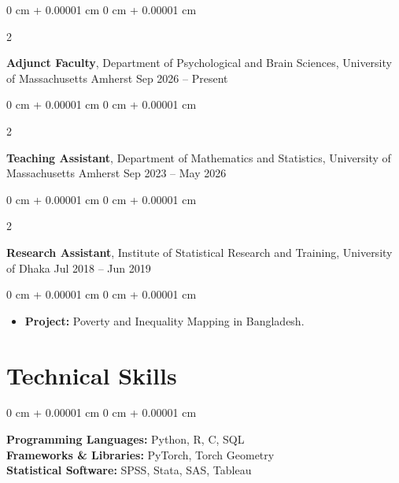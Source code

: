 \documentclass[10pt, letterpaper]{article}
\newenvironment{highlights}{
    \begin{itemize}[
        topsep=0.10 cm,
        parsep=0.10 cm,
        partopsep=0pt,
        itemsep=0pt,
        leftmargin=0 cm + 10pt
    ]
}{
    \end{itemize}
} %
\newenvironment{onecolentry}{
    \begin{adjustwidth}{
        0 cm + 0.00001 cm
    }{
        0 cm + 0.00001 cm
    }
}{
    \end{adjustwidth}
} %
\newenvironment{twocolentry}[2][]{
    \onecolentry
    \def\secondColumn{#2}
    \setcolumnwidth{\fill, 4.5 cm}
    \begin{paracol}{2}
}{
    \switchcolumn \raggedleft \secondColumn
    \end{paracol}
    \endonecolentry
} %
\begin{document}
    \vspace{0.25 cm}
    \begin{twocolentry}{
            Sep 2026 – Present
        }
            \textbf{Adjunct Faculty}, Department of Psychological and Brain Sciences, University of Massachusetts Amherst \end{twocolentry}

    \vspace{0.25 cm}
    \begin{twocolentry}{
            Sep 2023 – May 2026
        }
            \textbf{Teaching Assistant}, Department of Mathematics and Statistics, University of Massachusetts Amherst \end{twocolentry}


    \vspace{0.25 cm}
    \begin{twocolentry}{
            Jul 2018 – Jun 2019
        }
            \textbf{Research Assistant}, Institute of Statistical Research and Training, University of Dhaka \end{twocolentry}

        \vspace{0.10 cm}
        \begin{onecolentry}
            \begin{highlights}
                \item \textbf{Project:} Poverty and Inequality Mapping in Bangladesh.
            \end{highlights}
        \end{onecolentry}

    \vspace{0.25 cm}
    \section{Technical Skills} 
        \begin{onecolentry}
            \textbf{Programming Languages:} Python, R, C, SQL\\
            \textbf{Frameworks \& Libraries:} PyTorch, Torch Geometry\\
            \textbf{Statistical Software:} SPSS, Stata, SAS, Tableau\\
        \end{onecolentry}
        
\end{document}
